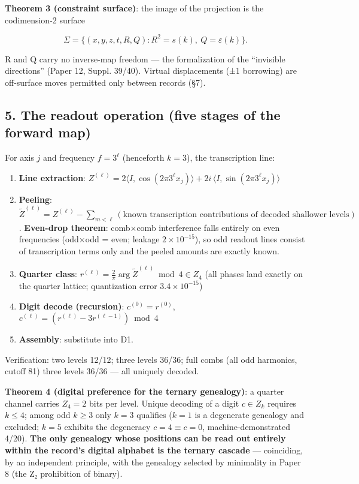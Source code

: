 \documentclass[
]{article}
\providecommand{\tightlist}{%
  \setlength{\itemsep}{0pt}\setlength{\parskip}{0pt}}
\begin{document}
\textbf{Theorem 3 (constraint surface)}: the image of the projection is
the codimension-2 surface

\[
\Sigma=\bigl\{(x,y,z,t,R,Q): R^2=s(k),\ Q=\varepsilon(k)\bigr\}.
\]

R and Q carry no inverse-map freedom --- the formalization of the
``invisible directions'' (Paper 12, Suppl. 39/40). Virtual displacements
(±1 borrowing) are off-surface moves permitted only between records
(§7).

\subsection{5. The readout operation (five stages of the forward
map)}\label{the-readout-operation-five-stages-of-the-forward-map}

For axis \(j\) and frequency \(f=3^\ell\) (henceforth \(k=3\)), the
transcription line:

\begin{enumerate}
\def\labelenumi{\arabic{enumi}.}
\tightlist
\item
  \textbf{Line extraction}:
  \(Z^{(\ell)}=2\langle I,\cos(2\pi 3^\ell x_j)\rangle+2i\,\langle I,\sin(2\pi 3^\ell x_j)\rangle\)
\item
  \textbf{Peeling}:
  \(\tilde Z^{(\ell)}=Z^{(\ell)}-\sum_{m<\ell}(\text{known transcription contributions of decoded shallower levels})\).
  \textbf{Even-drop theorem}: comb×comb interference falls entirely on
  even frequencies (odd×odd = even; leakage \(2\times10^{-15}\)), so odd
  readout lines consist of transcription terms only and the peeled
  amounts are exactly known.
\item
  \textbf{Quarter class}:
  \(r^{(\ell)}=\frac{2}{\pi}\arg\tilde Z^{(\ell)}\bmod 4\in Z_4\) (all
  phases land exactly on the quarter lattice; quantization error
  \(3.4\times10^{-15}\))
\item
  \textbf{Digit decode (recursion)}: \(c^{(0)}=r^{(0)}\),
  \(c^{(\ell)}=(r^{(\ell)}-3r^{(\ell-1)})\bmod4\)
\item
  \textbf{Assembly}: substitute into D1.
\end{enumerate}

Verification: two levels 12/12; three levels 36/36; full combs (all odd
harmonics, cutoff 81) three levels 36/36 --- all uniquely decoded.

\textbf{Theorem 4 (digital preference for the ternary genealogy)}: a
quarter channel carries \(Z_4=2\) bits per level. Unique decoding of a
digit \(c\in Z_k\) requires \(k\le4\); among odd \(k\ge3\) only \(k=3\)
qualifies (\(k{=}1\) is a degenerate genealogy and excluded; \(k{=}5\)
exhibits the degeneracy \(c{=}4\equiv c{=}0\), machine-demonstrated
4/20). \textbf{The only genealogy whose positions can be read out
entirely within the record's digital alphabet is the ternary cascade}
--- coinciding, by an independent principle, with the genealogy selected
by minimality in Paper 8 (the Z₂ prohibition of binary).
\end{document}
